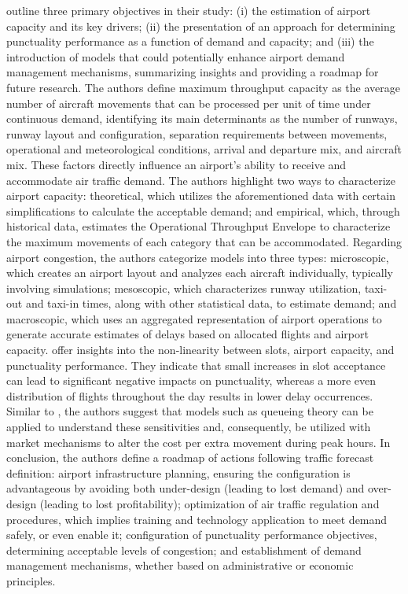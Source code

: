  outline three primary objectives in their
study: (i) the estimation of airport capacity and its key drivers; (ii) the
presentation of an approach for determining punctuality performance as a
function of demand and capacity; and (iii) the introduction of models that could
potentially enhance airport demand management mechanisms, summarizing insights
and providing a roadmap for future research.
%
The authors define maximum throughput capacity as the average number of aircraft
movements that can be processed per unit of time under continuous demand,
identifying its main determinants as the number of runways, runway layout and
configuration, separation requirements between movements, operational and
meteorological conditions, arrival and departure mix, and aircraft mix.
%
These factors directly influence an airport's ability to receive and accommodate
air traffic demand.
%
The authors highlight two ways to characterize airport capacity: theoretical,
which utilizes the aforementioned data with certain simplifications to calculate
the acceptable demand; and empirical, which, through historical data, estimates
the Operational Throughput Envelope to characterize the maximum movements of
each category that can be accommodated.
%
Regarding airport congestion, the authors categorize models into three types:
microscopic, which creates an airport layout and analyzes each aircraft
individually, typically involving simulations; mesoscopic, which characterizes
runway utilization, taxi-out and taxi-in times, along with other statistical
data, to estimate demand; and macroscopic, which uses an aggregated
representation of airport operations to generate accurate estimates of delays
based on allocated flights and airport capacity.
%
 offer insights into the non-linearity
between slots, airport capacity, and punctuality performance.
%
They indicate that small increases in slot acceptance can lead to significant
negative impacts on punctuality, whereas a more even distribution of flights
throughout the day results in lower delay occurrences.
%
Similar to , the authors suggest that models such
as queueing theory can be applied to understand these sensitivities and,
consequently, be utilized with market mechanisms to alter the cost per extra
movement during peak hours.
%
In conclusion, the authors define a roadmap of actions following traffic
forecast definition: airport infrastructure planning, ensuring the configuration
is advantageous by avoiding both under-design (leading to lost demand) and
over-design (leading to lost profitability); optimization of air traffic
regulation and procedures, which implies training and technology application to
meet demand safely, or even enable it; configuration of punctuality performance
objectives, determining acceptable levels of congestion; and establishment of
demand management mechanisms, whether based on administrative or economic
principles.



